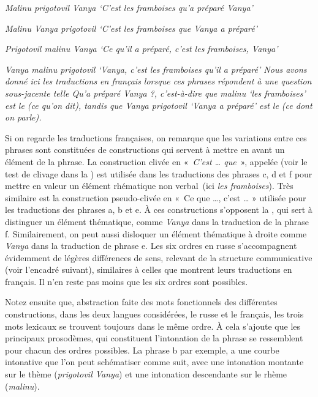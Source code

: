 {    \ex\itshape Malinu prigotovil Vanya
    \glt  ‘C’est les framboises qu’a préparé Vanya’

    \ex\itshape Malinu Vanya prigotovil
    \glt   ‘C’est les framboises que Vanya a préparé’

    \ex\itshape Prigotovil malinu Vanya
    \glt ‘Ce qu’il a préparé, c’est les framboises, Vanya’

    \ex\itshape Vanya malinu prigotovil
    \glt  ‘Vanya, c’est les framboises qu’il a préparé’
\z
\z
    Nous avons donné ici les traductions en français lorsque ces phrases répondent à une question sous-jacente telle \textit{Qu’a préparé Vanya} ?, c’est-à-dire que \textit{malinu} ‘les framboises’ est le  (ce qu’on dit), tandis que \textit{Vanya prigotovil} ‘Vanya a préparé’ est le  (ce dont on parle).

    Si on regarde les traductions françaises, on remarque que les variations entre ces phrases sont constituées de constructions qui servent à mettre en avant un élément de la phrase. La construction clivée en «~\textit{C’est … que}~», appelée  (voir le test de clivage dans la ) est utilisée dans les traductions des phrases c, d et f pour mettre en valeur un élément rhématique non verbal~(ici \textit{les framboises}). Très similaire est la construction pseudo-clivée en «~Ce que …, c’est … » utilisée pour les traductions des phrases a, b et e. À ces constructions s’opposent la , qui sert à distinguer un élément thématique, comme \textit{Vanya} dans la traduction de la phrase f. Similairement, on peut aussi disloquer un élément thématique à droite comme \textit{Vanya} dans la traduction de phrase e. Les six ordres en russe s’accompagnent évidemment de légères différences de sens, relevant de la structure communicative (voir l’encadré suivant), similaires à celles que montrent leurs traductions en français. Il n’en reste pas moins que les six ordres sont possibles.

    Notez ensuite que, abstraction faite des mots fonctionnels des différentes constructions, dans les deux langues considérées, le russe et le français, les trois mots lexicaux se trouvent toujours dans le même ordre. À cela s’ajoute que les principaux prosodèmes, qui constituent l’intonation de la phrase se ressemblent pour chacun des ordres possibles. La phrase b par exemple, a une courbe intonative que l’on peut schématiser comme suit, avec une intonation montante sur le thème (\textit{prigotovil Vanya}) et une intonation descendante sur le rhème (\textit{malinu}).

}
